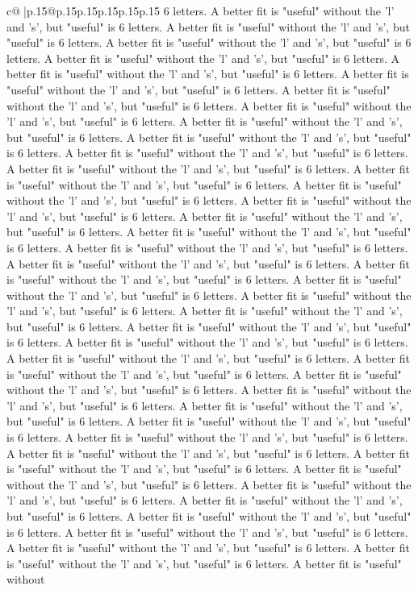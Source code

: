 \documentclass{article}
\begin{document}
{\begin{supertabular}{c@{$\;$}|p{.15\linewidth}@{}p{.15\linewidth}p{.15\linewidth}p{.15\linewidth}p{.15\linewidth}p{.15\linewidth}}
{{{6 letters. A better fit is "useful" without the 'l' and 's', but "useful" is 6 letters. A better fit is "useful" without the 'l' and 's', but "useful" is 6 letters. A better fit is "useful" without the 'l' and 's', but "useful" is 6 letters. A better fit is "useful" without the 'l' and 's', but "useful" is 6 letters. A better fit is "useful" without the 'l' and 's', but "useful" is 6 letters. A better fit is "useful" without the 'l' and 's', but "useful" is 6 letters. A better fit is "useful" without the 'l' and 's', but "useful" is 6 letters. A better fit is "useful" without the 'l' and 's', but "useful" is 6 letters. A better fit is "useful" without the 'l' and 's', but "useful" is 6 letters. A better fit is "useful" without the 'l' and 's', but "useful" is 6 letters. A better fit is "useful" without the 'l' and 's', but "useful" is 6 letters. A better fit is "useful" without the 'l' and 's', but "useful" is 6 letters. A better fit is "useful" without the 'l' and 's', but "useful" is 6 letters. A better fit is "useful" without the 'l' and 's', but "useful" is 6 letters. A better fit is "useful" without the 'l' and 's', but "useful" is 6 letters. A better fit is "useful" without the 'l' and 's', but "useful" is 6 letters. A better fit is "useful" without the 'l' and 's', but "useful" is 6 letters. A better fit is "useful" without the 'l' and 's', but "useful" is 6 letters. A better fit is "useful" without the 'l' and 's', but "useful" is 6 letters. A better fit is "useful" without the 'l' and 's', but "useful" is 6 letters. A better fit is "useful" without the 'l' and 's', but "useful" is 6 letters. A better fit is "useful" without the 'l' and 's', but "useful" is 6 letters. A better fit is "useful" without the 'l' and 's', but "useful" is 6 letters. A better fit is "useful" without the 'l' and 's', but "useful" is 6 letters. A better fit is "useful" without the 'l' and 's', but "useful" is 6 letters. A better fit is "useful" without the 'l' and 's', but "useful" is 6 letters. A better fit is "useful" without the 'l' and 's', but "useful" is 6 letters. A better fit is "useful" without the 'l' and 's', but "useful" is 6 letters. A better fit is "useful" without the 'l' and 's', but "useful" is 6 letters. A better fit is "useful" without the 'l' and 's', but "useful" is 6 letters. A better fit is "useful" without the 'l' and 's', but "useful" is 6 letters. A better fit is "useful" without the 'l' and 's', but "useful" is 6 letters. A better fit is "useful" without the 'l' and 's', but "useful" is 6 letters. A better fit is "useful" without the 'l' and 's', but "useful" is 6 letters. A better fit is "useful" without the 'l' and 's', but "useful" is 6 letters. A better fit is "useful" without the 'l' and 's', but "useful" is 6 letters. A better fit is "useful" without the 'l' and 's', but "useful" is 6 letters. A better fit is "useful" without the 'l' and 's', but "useful" is 6 letters. A better fit is "useful" without the 'l' and 's', but "useful" is 6 letters. A better fit is "useful" without the 'l' and 's', but "useful" is 6 letters. A better fit is "useful" without the 'l' and 's', but "useful" is 6 letters. A better fit is "useful" without }}}
\end{supertabular}}
\end{document}
